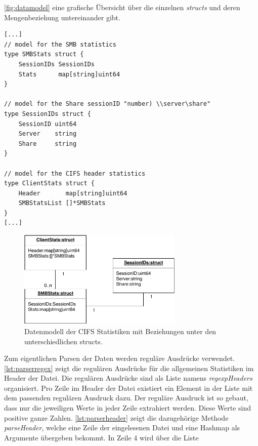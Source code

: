 \documentclass[titlepage]{report}
\begin{document}
\autoref{fig:datamodel} eine grafische Übersicht über die einzelnen
\emph{structs} und deren Mengenbeziehung untereinander gibt.
\\
\begin{minipage}{\linewidth}
\begin{lstlisting}[caption={Nicht vollständiger Auszug aus der Datei
cifs.go},label={lst:parserdata}]
[...]
// model for the SMB statistics
type SMBStats struct {
	SessionIDs SessionIDs
	Stats      map[string]uint64
}

// model for the Share sessionID "number) \\server\share"
type SessionIDs struct {
	SessionID uint64
	Server    string
	Share     string
}

// model for the CIFS header statistics
type ClientStats struct {
	Header       map[string]uint64
	SMBStatsList []*SMBStats
}
[...]
\end{lstlisting}
\end{minipage}
\begin{figure}[H]
    \centering
    \includegraphics[width=0.7\textwidth]{figures/datamodel.pdf}
    \caption{Datenmodell der CIFS Statistiken mit Beziehungen unter den
    unterschiedlichen structs.}\label{fig:datamodel}
\end{figure}
Zum eigentlichen Parsen der Daten werden reguläre Ausdrücke verwendet.
\autoref{lst:parserregex} zeigt die regulären Ausdrücke für die
allgemeinen Statistiken im Header der  Datei.
Die regulären Ausdrücke sind als Liste namens \emph{regexpHeaders}
organisiert. Pro Zeile im Header der  Datei
existiert ein Element in der Liste mit dem passenden regulären Ausdruck
dazu. Der reguläre Ausdruck ist so gebaut, dass nur die jeweiligen Werte
in jeder Zeile extrahiert werden. Diese Werte sind positive ganze Zahlen.
\autoref{lst:parserheader} zeigt die dazugehörige Methode
\emph{parseHeader}, welche eine Zeile der eingelesenen Datei und eine
Hashmap als Argumente übergeben bekommt. In Zeile 4 wird über die Liste
\end{document}
